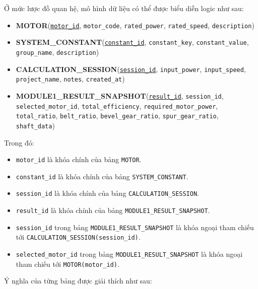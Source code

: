 \documentclass[a4paper]{article}
\begin{document}
Ở mức lược đồ quan hệ, mô hình dữ liệu có thể được biểu diễn logic như sau:

\begin{itemize}
\item \textbf{MOTOR}(\underline{\texttt{motor\_id}}, \texttt{motor\_code}, \texttt{rated\_power}, \texttt{rated\_speed}, \texttt{description})
\item \textbf{SYSTEM\_CONSTANT}(\underline{\texttt{constant\_id}}, \texttt{constant\_key}, \texttt{constant\_value}, \texttt{group\_name}, \texttt{description})
\item \textbf{CALCULATION\_SESSION}(\underline{\texttt{session\_id}}, \texttt{input\_power}, \texttt{input\_speed}, \texttt{project\_name}, \texttt{notes}, \texttt{created\_at})
\item \textbf{MODULE1\_RESULT\_SNAPSHOT}(\underline{\texttt{result\_id}}, \texttt{session\_id}, \texttt{selected\_motor\_id}, \texttt{total\_efficiency}, \texttt{required\_motor\_power}, \texttt{total\_ratio}, \texttt{belt\_ratio}, \texttt{bevel\_gear\_ratio}, \texttt{spur\_gear\_ratio}, \texttt{shaft\_data})
\end{itemize}

Trong đó:

\begin{itemize}
\item \texttt{motor\_id} là khóa chính của bảng \texttt{MOTOR}.
\item \texttt{constant\_id} là khóa chính của bảng \texttt{SYSTEM\_CONSTANT}.
\item \texttt{session\_id} là khóa chính của bảng \texttt{CALCULATION\_SESSION}.
\item \texttt{result\_id} là khóa chính của bảng \texttt{MODULE1\_RESULT\_SNAPSHOT}.
\item \texttt{session\_id} trong bảng \texttt{MODULE1\_RESULT\_SNAPSHOT} là khóa ngoại tham chiếu tới \texttt{CALCULATION\_SESSION(session\_id)}.
\item \texttt{selected\_motor\_id} trong bảng \texttt{MODULE1\_RESULT\_SNAPSHOT} là khóa ngoại tham chiếu tới \texttt{MOTOR(motor\_id)}.
\end{itemize}

Ý nghĩa của từng bảng được giải thích như sau:
\end{document}
